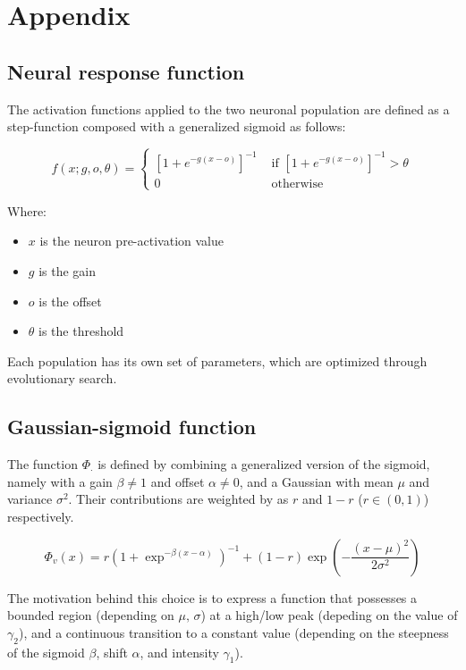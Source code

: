 
\section{Appendix}\label{sec:appendix}

\subsection{Neural response function}

The activation functions applied to the two neuronal population are defined as a step-function composed with a generalized sigmoid as follows:

\begin{equation}
f(x; g, o, \theta) =
\begin{cases}
    \left[1 + e^{-g(x - o)}\right]^{-1} & \text{ if } \left[1 + e^{-g(x - o)}\right]^{-1} > \theta \\
0 & \text{ otherwise}
\end{cases}
\end{equation}

Where:
\begin{itemize}
\item $x$ is the neuron pre-activation value
\item $g$ is the gain
\item $o$ is the offset
\item $\theta$ is the threshold
\end{itemize}
\noindent Each population has its own set of parameters, which are optimized through evolutionary search.

\subsection{Gaussian-sigmoid function}

\noindent The function $\Phi_{\cdot}$ is defined by combining a generalized version of the sigmoid, namely with a gain $\beta \neq 1$ and offset $\alpha\neq 0$, and a Gaussian with mean $\mu$ and variance $\sigma^{2}$. Their contributions are weighted by as $r$ and $1-r$ ($r\in(0,1)$) respectively.

\begin{equation*}
    \Phi_v(x) = r\left(1 + \exp^{-\beta(x-\alpha)}\right)^{-1} + (1-r)\exp\left(-\frac{(x-\mu)^2}{2\sigma^2}\right)
\end{equation*}

\noindent The motivation behind this choice is to express a function that possesses a bounded region (depending on $\mu,\,\sigma$) at a high/low peak (depeding on the value of $\gamma_{2}$), and a continuous transition to a constant value (depending on the steepness of the sigmoid $\beta$, shift
$\alpha$, and intensity $\gamma_{1}$).

